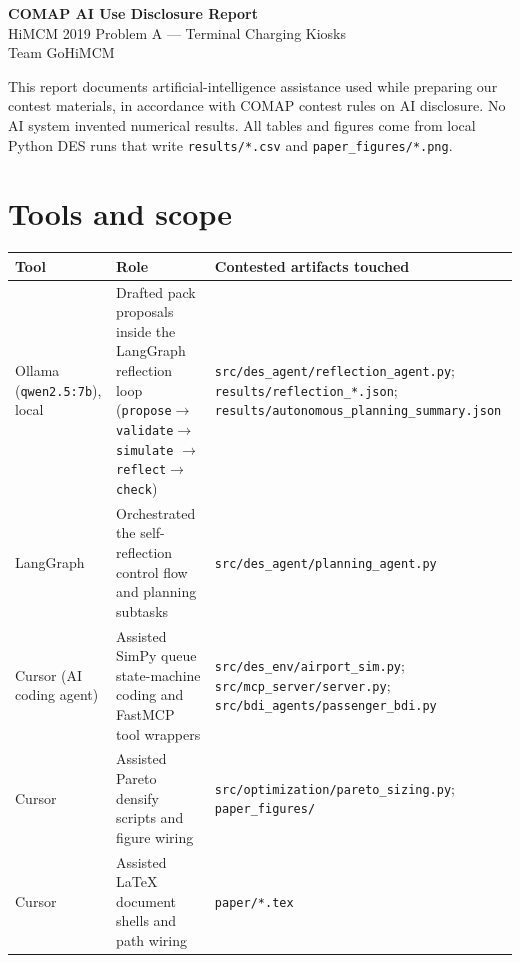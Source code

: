 \documentclass[11pt]{article}
\begin{document}
\begin{center}
{\Large\bfseries COMAP AI Use Disclosure Report}\\[0.35em]
{\large HiMCM 2019 Problem A --- Terminal Charging Kiosks}\\[0.25em]
{\normalsize Team GoHiMCM}
\end{center}

\vspace{0.8em}
\noindent
This report documents artificial-intelligence assistance used while
preparing our contest materials, in accordance with COMAP contest rules
on AI disclosure.
No AI system invented numerical results.
All tables and figures come from local Python DES runs that write
\texttt{results/*.csv} and \texttt{paper\_figures/*.png}.

\section{Tools and scope}
\begin{table}[htbp]
  \centering
  \small
  \begin{tabular}{p{3.2cm}p{5.0cm}p{5.2cm}}
    \toprule
    Tool & Role & Contested artifacts touched \\
    \midrule
    Ollama (\texttt{qwen2.5:7b}), local
      & Drafted pack proposals inside the LangGraph reflection loop
        (\texttt{propose}$\to$\texttt{validate}$\to$\texttt{simulate}
        $\to$\texttt{reflect}$\to$\texttt{check})
      & \texttt{src/des\_agent/reflection\_agent.py};
        \texttt{results/reflection\_*.json};
        \texttt{results/autonomous\_planning\_summary.json} \\
    LangGraph
      & Orchestrated the self-reflection control flow and planning
        subtasks
      & \texttt{src/des\_agent/planning\_agent.py} \\
    Cursor (AI coding agent)
      & Assisted SimPy queue state-machine coding and FastMCP tool
        wrappers
      & \texttt{src/des\_env/airport\_sim.py};
        \texttt{src/mcp\_server/server.py};
        \texttt{src/bdi\_agents/passenger\_bdi.py} \\
    Cursor
      & Assisted Pareto densify scripts and figure wiring
      & \texttt{src/optimization/pareto\_sizing.py};
        \texttt{paper\_figures/} \\
    Cursor
      & Assisted LaTeX document shells and path wiring
      & \texttt{paper/*.tex} \\
    \bottomrule
  \end{tabular}
\end{table}
\end{document}
